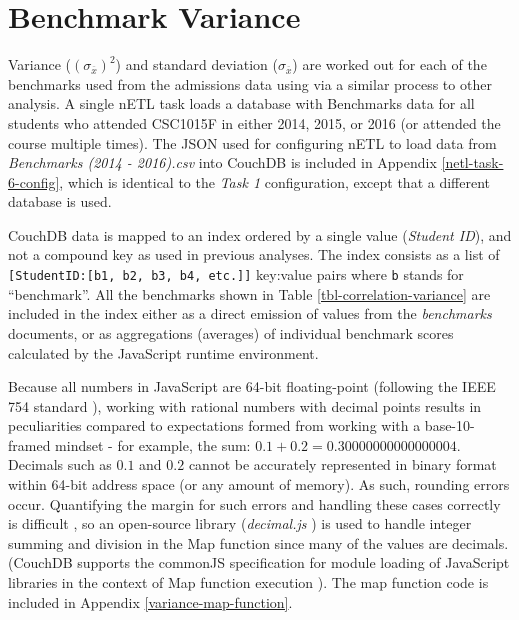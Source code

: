 \section{Benchmark Variance}
Variance ($(\sigma_{\overline{x}})^{2}$) and standard deviation ($\sigma_{\overline{x}}$) are worked out for each of the benchmarks used from the admissions data using via a similar process to other analysis. A single nETL task loads a database with Benchmarks data for all students who attended CSC1015F in either 2014, 2015, or 2016 (or attended the course multiple times). The JSON used for configuring nETL to load data from \textit{Benchmarks (2014 - 2016).csv} into CouchDB is included in Appendix \ref{netl-task-6-config}, which is identical to the \textit{Task 1} configuration, except that a different database is used.

CouchDB data is mapped to an index ordered by a single value (\textit{Student ID}), and not a compound key as used in previous analyses. The index consists as a list of \texttt{[StudentID:[b1, b2, b3, b4, etc.]]} key:value pairs where \texttt{b} stands for ``benchmark''. All the benchmarks shown in Table \ref{tbl-correlation-variance} are included in the index either as a direct emission of values from the \textit{benchmarks} documents, or as aggregations (averages) of individual benchmark scores calculated by the JavaScript runtime environment.

Because all numbers in JavaScript are 64-bit floating-point (following the IEEE 754 standard \cite{floatingPoint}), working with rational numbers with decimal points results in peculiarities compared to expectations formed from working with a base-10-framed mindset - for example, the sum: $0.1 + 0.2 = 0.30000000000000004$. Decimals such as $0.1$ and $0.2$ cannot be accurately represented in binary format within 64-bit address space (or any amount of memory). As such, rounding errors occur. Quantifying the margin for such errors and handling these cases correctly is difficult \cite{Goldberg1991}, so an open-source library (\textit{decimal.js} \cite{decimaljs}) is used to handle integer summing and division in the Map function since many of the values are decimals. (CouchDB supports the commonJS specification for module loading of JavaScript libraries in the context of Map function execution \cite{commonJsMapFn}). The map function code is included in Appendix \ref{variance-map-function}.

